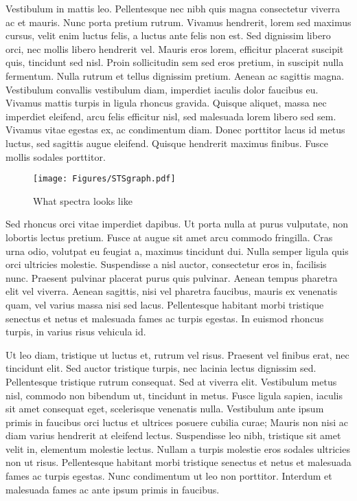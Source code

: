 Vestibulum in mattis leo. Pellentesque nec nibh quis magna consectetur viverra ac et mauris. Nunc porta pretium rutrum. Vivamus hendrerit, lorem sed maximus cursus, velit enim luctus felis, a luctus ante felis non est. Sed dignissim libero orci, nec mollis libero hendrerit vel. Mauris eros lorem, efficitur placerat suscipit quis, tincidunt sed nisl. Proin sollicitudin sem sed eros pretium, in suscipit nulla fermentum. Nulla rutrum et tellus dignissim pretium. Aenean ac sagittis magna. Vestibulum convallis vestibulum diam, imperdiet iaculis dolor faucibus eu. Vivamus mattis turpis in ligula rhoncus gravida. Quisque aliquet, massa nec imperdiet eleifend, arcu felis efficitur nisl, sed malesuada lorem libero sed sem. Vivamus vitae egestas ex, ac condimentum diam. Donec porttitor lacus id metus luctus, sed sagittis augue eleifend. Quisque hendrerit maximus finibus. Fusce mollis sodales porttitor.

    \begin{figure}
        \centering
        \texttt{[image: Figures/STSgraph.pdf]}
        \caption{What spectra looks like}
        \label{fig:tip shapes}
    \end{figure}

Sed rhoncus orci vitae imperdiet dapibus. Ut porta nulla at purus vulputate, non lobortis lectus pretium. Fusce at augue sit amet arcu commodo fringilla. Cras urna odio, volutpat eu feugiat a, maximus tincidunt dui. Nulla semper ligula quis orci ultricies molestie. Suspendisse a nisl auctor, consectetur eros in, facilisis nunc. Praesent pulvinar placerat purus quis pulvinar. Aenean tempus pharetra elit vel viverra. Aenean sagittis, nisi vel pharetra faucibus, mauris ex venenatis quam, vel varius massa nisi sed lacus. Pellentesque habitant morbi tristique senectus et netus et malesuada fames ac turpis egestas. In euismod rhoncus turpis, in varius risus vehicula id.

Ut leo diam, tristique ut luctus et, rutrum vel risus. Praesent vel finibus erat, nec tincidunt elit. Sed auctor tristique turpis, nec lacinia lectus dignissim sed. Pellentesque tristique rutrum consequat. Sed at viverra elit. Vestibulum metus nisl, commodo non bibendum ut, tincidunt in metus. Fusce ligula sapien, iaculis sit amet consequat eget, scelerisque venenatis nulla. Vestibulum ante ipsum primis in faucibus orci luctus et ultrices posuere cubilia curae; Mauris non nisi ac diam varius hendrerit at eleifend lectus. Suspendisse leo nibh, tristique sit amet velit in, elementum molestie lectus. Nullam a turpis molestie eros sodales ultricies non ut risus. Pellentesque habitant morbi tristique senectus et netus et malesuada fames ac turpis egestas. Nunc condimentum ut leo non porttitor. Interdum et malesuada fames ac ante ipsum primis in faucibus.